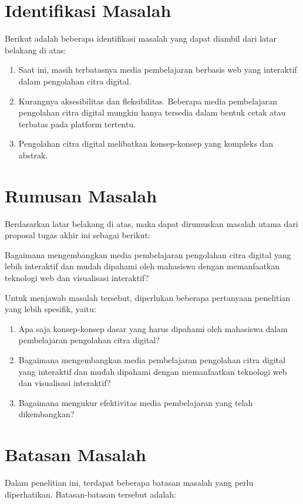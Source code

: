 \section{Identifikasi Masalah}
Berikut adalah beberapa identifikasi masalah yang dapat diambil dari latar belakang di atas:

\begin{enumerate}
	\item Saat ini, masih terbatasnya media pembelajaran berbasis web yang interaktif dalam pengolahan citra digital.
	\item Kurangnya aksesibilitas dan fleksibilitas. Beberapa media pembelajaran pengolahan citra digital mungkin hanya tersedia dalam bentuk cetak atau terbatas pada platform tertentu.
	\item Pengolahan citra digital melibatkan konsep-konsep yang kompleks dan abstrak.
\end{enumerate}

\section{Rumusan Masalah}
Berdasarkan latar belakang di atas, maka dapat dirumuskan masalah utama dari proposal tugas akhir ini sebagai berikut:

Bagaimana mengembangkan media pembelajaran pengolahan citra digital yang lebih interaktif dan mudah dipahami oleh mahasiswa dengan memanfaatkan teknologi web dan visualisasi interaktif?

Untuk menjawab masalah tersebut, diperlukan beberapa pertanyaan penelitian yang lebih spesifik, yaitu:

\begin{enumerate}
	\item Apa saja konsep-konsep dasar yang harus dipahami oleh mahasiswa dalam pembelajaran pengolahan citra digital?
	\item Bagaimana mengembangkan media pembelajaran pengolahan citra digital yang interaktif dan mudah dipahami dengan memanfaatkan teknologi web dan visualisasi interaktif?
	\item Bagaimana mengukur efektivitas media pembelajaran yang telah dikembangkan?
\end{enumerate}

\section{Batasan Masalah}

Dalam penelitian ini, terdapat beberapa batasan masalah yang perlu diperhatikan. Batasan-batasan tersebut adalah:

